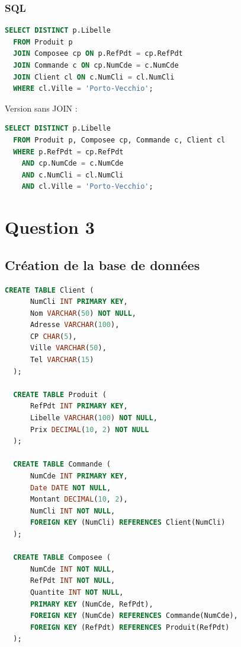 \documentclass{article}
\begin{document}
\subsubsection{SQL}

\begin{lstlisting}[language=SQL]
  SELECT DISTINCT p.Libelle 
  FROM Produit p
  JOIN Composee cp ON p.RefPdt = cp.RefPdt
  JOIN Commande c ON cp.NumCde = c.NumCde
  JOIN Client cl ON c.NumCli = cl.NumCli
  WHERE cl.Ville = 'Porto-Vecchio';
\end{lstlisting}

Version sans JOIN :

\begin{lstlisting}[language=SQL]
  SELECT DISTINCT p.Libelle 
  FROM Produit p, Composee cp, Commande c, Client cl
  WHERE p.RefPdt = cp.RefPdt 
    AND cp.NumCde = c.NumCde 
    AND c.NumCli = cl.NumCli 
    AND cl.Ville = 'Porto-Vecchio';
\end{lstlisting}

\break\section{Question 3}

\subsection{Création de la base de données}

\begin{lstlisting}[language=SQL]
  CREATE TABLE Client (
      NumCli INT PRIMARY KEY, 
      Nom VARCHAR(50) NOT NULL, 
      Adresse VARCHAR(100), 
      CP CHAR(5), 
      Ville VARCHAR(50), 
      Tel VARCHAR(15)
  );
  
  CREATE TABLE Produit (
      RefPdt INT PRIMARY KEY, 
      Libelle VARCHAR(100) NOT NULL, 
      Prix DECIMAL(10, 2) NOT NULL
  );
  
  CREATE TABLE Commande (
      NumCde INT PRIMARY KEY, 
      Date DATE NOT NULL, 
      Montant DECIMAL(10, 2), 
      NumCli INT NOT NULL, 
      FOREIGN KEY (NumCli) REFERENCES Client(NumCli)
  );
  
  CREATE TABLE Composee (
      NumCde INT NOT NULL, 
      RefPdt INT NOT NULL, 
      Quantite INT NOT NULL, 
      PRIMARY KEY (NumCde, RefPdt), 
      FOREIGN KEY (NumCde) REFERENCES Commande(NumCde), 
      FOREIGN KEY (RefPdt) REFERENCES Produit(RefPdt)
  );
\end{lstlisting}
\end{document}
